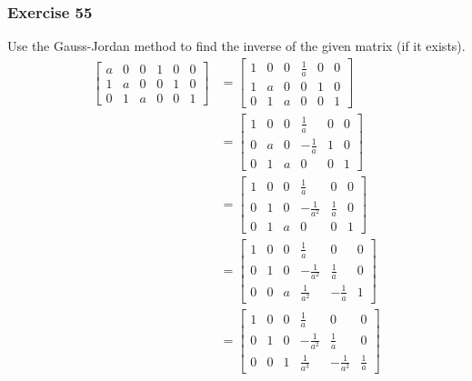 \documentclass{math}
\begin{document}
\subsubsection*{Exercise 55}
Use the Gauss-Jordan method to find the inverse of the given matrix (if it
exists).
\begin{align*}
  \begin{bmatrix}
    a & 0 & 0 & 1 & 0 & 0 \\
    1 & a & 0 & 0 & 1 & 0 \\
    0 & 1 & a & 0 & 0 & 1
  \end{bmatrix} &= \begin{bmatrix}
    1 & 0 & 0 & \frac{1}{a} & 0 & 0 \\
    1 & a & 0 & 0 & 1 & 0 \\
    0 & 1 & a & 0 & 0 & 1
  \end{bmatrix} \\
  &= \begin{bmatrix}
    1 & 0 & 0 & \frac{1}{a} & 0 & 0 \\
    0 & a & 0 & -\frac{1}{a} & 1 & 0 \\
    0 & 1 & a & 0 & 0 & 1
  \end{bmatrix} \\
  &= \begin{bmatrix}
    1 & 0 & 0 & \frac{1}{a} & 0 & 0 \\
    0 & 1 & 0 & -\frac{1}{a^2} & \frac{1}{a} & 0 \\
    0 & 1 & a & 0 & 0 & 1
  \end{bmatrix} \\
  &= \begin{bmatrix}
    1 & 0 & 0 & \frac{1}{a} & 0 & 0 \\
    0 & 1 & 0 & -\frac{1}{a^2} & \frac{1}{a} & 0 \\
    0 & 0 & a & \frac{1}{a^2} & -\frac{1}{a} & 1
  \end{bmatrix} \\
  &= \begin{bmatrix}
    1 & 0 & 0 & \frac{1}{a} & 0 & 0 \\
    0 & 1 & 0 & -\frac{1}{a^2} & \frac{1}{a} & 0 \\
    0 & 0 & 1 & \frac{1}{a^3} & -\frac{1}{a^2} & \frac{1}{a}
  \end{bmatrix}
\end{align*}
\end{document}

